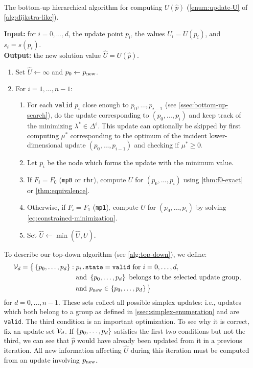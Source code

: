 \documentclass{article}
\begin{document}
\begin{algorithm}[t]
  \caption{The bottom-up hierarchical algorithm for computing
    $U(\hat{p})$ (\cref{enum:update-U} of
    \cref{alg:dijkstra-like}).}\label{alg:bottom-up}
  \textbf{Input:} for $i = 0, \hdots, d$, the update point $p_i$, the
  values
  $U_i = U(p_i)$, and $s_i = s(p_i)$. \\
  \textbf{Output:} the new solution value $\hat{U} = U(\hat{p})$.
  \begin{enumerate}[nolistsep]
  \item Set $\hat{U} \gets \infty$ and $p_0 \gets p_{\operatorname{new}}$.
  \item For $i = 1, \hdots, n - 1$:
    \begin{enumerate}
    \item For each \texttt{valid} $p_i$ close enough to
      $p_0, \hdots, p_{i-1}$ (see \cref{ssec:bottom-up-search}), do
      the update corresponding to $(p_0, \hdots, p_i)$ and keep track
      of the minimizing $\lambda^* \in \Delta^i$. This update can
      optionally be skipped by first computing $\mu^*$ corresponding
      to the optimum of the incident lower-dimensional update
      $(p_0, \hdots, p_{i-1})$ and checking if
      $\mu^* \geq 0$.\label{item:bottom-up-for}
    \item Let $p_i$ be the node which forms the update with the
      minimum value.
    \item If $F_i = F_0$ (\texttt{mp0} or \texttt{rhr}), compute $U$
      for $(p_0, \hdots, p_{i})$ using \cref{thm:f0-exact} or
      \cref{thm:equivalence}.
    \item Otherwise, if $F_i = F_1$ (\texttt{mp1}), compute $U$ for
      $(p_0, \hdots, p_{i})$ by solving
      \cref{eq:constrained-minimization}.
    \item Set $\hat{U} \gets \min(\hat{U}, U)$.
    \end{enumerate}
  \end{enumerate}
\end{algorithm}

To describe our top-down algorithm (see \cref{alg:top-down}), we
define:
\begin{equation}\label{eq:calU}
  \begin{aligned}
    \mathcal{V}_d = \big\{\left\{p_0, \hdots, p_d\right\}: \; &p_i\texttt{.state}=\texttt{valid} \mbox{ for } i = 0, \hdots, d, \\
    &\mbox{and } \left\{p_0, \hdots, p_d\right\} \mbox{ belongs to the selected update group}, \\
    &\mbox{and } p_{\operatorname{new}} \in \left\{p_0, \hdots, p_d\right\} \big\}
  \end{aligned}
\end{equation}
for $d = 0, \hdots, n - 1$. These sets collect all possible simplex
updates: i.e., updates which both belong to a group as defined in
\cref{ssec:simplex-enumeration} and are \texttt{valid}. The third
condition is an important optimization. To see why it is correct, fix
an update set $\mathcal{V}_d$. If $\left\{p_0, \hdots, p_d\right\}$ satisfies the
first two conditions but not the third, we can see that $\hat{p}$
would have already been updated from it in a previous iteration. All
new information affecting $\hat{U}$ during this iteration must be
computed from an update involving $p_{\operatorname{new}}$.
\end{document}
